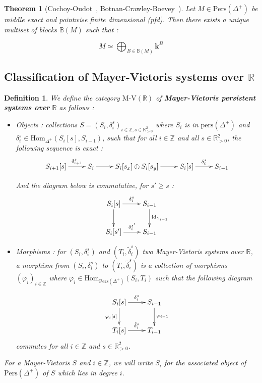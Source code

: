 \documentclass[a4paper, english, 11pt]{article}
\newcommand{\kk}[0]{\textbf{k}}
\newcommand{\0}{\vec{0}}
\newcommand{\R}[0]{\mathbb{R}}
\newcommand{\Z}[0]{\mathbb{Z}}
\newcommand{\Hom}[0]{\text{Hom}}
\newcommand{\Pers}[0]{\text{Pers}}
\newtheorem{defi}[prop]{Definition}
\newtheorem{thm}[prop]{Theorem}
\begin{document}
\begin{thm}[Cochoy-Oudot~\cite{CO17}, Botnan-Crawley-Boevey~\cite{BotCra18}] \label{thm:exactdecomp}
Let $M\in \Pers(\Delta^+)$ be middle exact and pointwise finite dimensional (pfd). Then there exists a unique multiset of blocks $\mathbb{B}(M)$ such that : 

$$M \simeq \bigoplus_{B\in \mathbb{B}(M)} \kk^B $$
\end{thm}




\subsection{Classification of Mayer-Vietoris systems over $\R$}\label{S:ClassMVSystems}

\begin{defi}\label{D:MVSystem}
We define the category $\text{M-V}(\R)$ of \textbf{Mayer-Vietoris persistent systems over} $\R$ as follows : 

\begin{itemize}
    \item[$\bullet$] Objects : collections $S=(S_i,\delta_i^s)_{i\in \Z,s\in \R_{>0}^2}$ where $S_i$ is in $\text{pers}(\Delta^+)$ and $\delta_i^s\in \Hom_{\Delta^+}(S_i[s], S_{i-1})$, such that for all $i\in \Z$ and all $s\in \R_{>0}^2$, the following sequence is exact : 
    \begin{equation}\xymatrix{S_{i+1}[s] \ar[r]^-{\delta_{i+1}^s} & S_i \ar[r] & S_i[s_x] \oplus S_i[s_y] \ar[r] & S_i[s] \ar[r]^-{\delta_{i}^s} & S_{i-1}}\label{eq:MVSystemles}\end{equation}
    
    And the diagram below is commutative, for $s'\geq s$ :  \begin{equation}\label{D:ComSaquareforMV}\xymatrix{  S_i[s] \ar[r]^-{\delta_{i}^{s}} \ar[d] & S_{i-1} \ar[d]^{\text{id}_{S_{i-1}}} \\
    S_i[s'] \ar[r]^-{{\delta}_{i}^{s'}} & S_{i-1}}\end{equation}
    
    \item[$\bullet$] Morphisms : for $(S_i,\delta_i^s)$ and $(T_i,\tilde{\delta}_i^s)$ two Mayer-Vietoris systems over $\R$, a morphism from $(S_i,\delta_i^s)$ to $(T_i,\tilde{\delta}_i^s)$ is a collection of morphisms $(\varphi_i)_{i\in \Z}$ where $\varphi_i \in \Hom_{\Pers(\Delta^+)}(S_i,T_i)$ such that the following diagram
    
   \begin{equation}\xymatrix{  S_i[s] \ar[r]^-{\delta_{i}^s} \ar[d]_{\varphi_i[s]} & S_{i-1} \ar[d]^{\varphi_{i-1}} \\
    T_i[s] \ar[r]^-{\tilde{\delta}_{i}^s} & T_{i-1}}\end{equation} commutes for all $i\in \Z$ and $s\in \R_{>0}^2$. 
\end{itemize}
For a Mayer-Vietoris $S$ and $i\in \Z$, we will write $S_i$ for the associated object of $\Pers(\Delta^+)$ of $S$ which lies in degree $i$.
\end{defi}
\end{document}
